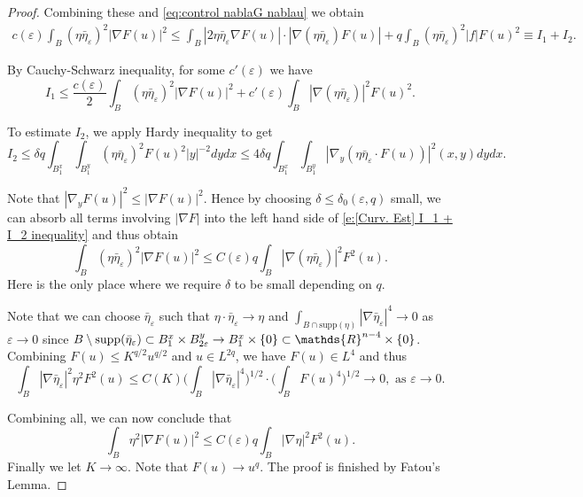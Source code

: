 \documentclass[10pt,a4paper]{amsart}
\newcommand{\RR}{\mathds{R}}
\newcommand{\supp}{\mathrm{supp }}
\begin{document}
\begin{proof}
Combining these and \eqref{eq:control nablaG nablau} we obtain
\begin{align}\label{e:[Curv. Est] I_1 + I_2 inequality}
    c(\varepsilon) \int_B (\eta \bar{\eta}_{\varepsilon})^2 |\nabla F(u)|^2 \leqslant \int_{B} |2 \eta \bar{\eta}_{\varepsilon} \nabla F(u)| \cdot |\nabla(\eta \bar{\eta}_{\varepsilon}) F(u)|  + q \int_B (\eta \bar{\eta}_{\varepsilon})^2 |f| F(u)^2 \equiv I_1 + I_2.
\end{align}

By Cauchy-Schwarz inequality, for some $c'(\varepsilon)$ we have
\begin{equation}
    I_1 \leqslant \frac{c(\varepsilon)}{2} \int_B (\eta \bar{\eta}_{\varepsilon})^2 |\nabla F(u)|^2 + c'(\varepsilon) \int_B |\nabla (\eta \bar{\eta}_{\varepsilon})|^2 F(u)^2.
\end{equation}

To estimate $I_2$, we apply Hardy inequality to get
\begin{equation}\label{e:[curvatuer bound] I_2}
    I_2 \leqslant  \delta q \int_{B_1^x} \int_{B_1^y} 
    (\eta \bar{\eta}_{\varepsilon})^2 F(u)^2 |y|^{-2} dy dx \leqslant  4\delta q \int_{B_1^x} \int_{B_1^y} |\nabla_y   (\eta \bar{\eta}_{\varepsilon} \cdot F(u))|^2(x,y) dy dx. 
\end{equation}

Note that $|\nabla_y F(u)|^2 \leqslant |\nabla F(u)|^2$. Hence by choosing $\delta \leqslant \delta_0(\varepsilon,q)$ small, we can absorb all terms involving $|\nabla F|$ into the left hand side of \eqref{e:[Curv. Est] I_1 + I_2 inequality} and thus obtain
\begin{equation}
    \int_{B} (\eta \bar{\eta}_{\varepsilon})^2 |\nabla F(u)|^2 \leqslant C(\varepsilon)q \int_B |\nabla (\eta \bar{\eta}_{\varepsilon})|^2 F^2(u).
\end{equation}
Here is the only place where we require $\delta$ to be small depending on $q$. 

Note that we can choose $\bar{\eta}_{\varepsilon}$ such that $\eta \cdot \bar{\eta}_{\varepsilon} \to \eta$ and $\int_{B \cap \supp(\eta)} | \nabla \bar{\eta}_{\varepsilon}|^4 \to 0$ as $\varepsilon \to 0$ since $B\setminus \supp(\Bar{\eta}_{\varepsilon}) \subset B_1^x \times B_{2\varepsilon}^y \to B_1^x \times \{0\} \subset \RR^{n-4} \times \{0\}$. Combining $F(u) \leqslant K^{q/2} u^{q/2}$ and $u \in L^{2q}$, we have $F(u) \in L^4$ and thus
\begin{equation}
    \int_{B} |\nabla \bar{\eta}_{\varepsilon}|^2 \eta^2 F^2(u) \leqslant C(K) \Bigg(\int_{B} |\nabla \bar{\eta}_{\varepsilon}|^4 \Bigg)^{1/2} \cdot \Bigg( \int_B F(u)^4 \Bigg)^{1/2} \to 0, \text{ as } \varepsilon \to 0.
\end{equation}

Combining all, we can now conclude that
\begin{equation}
    \int_{B} \eta^2 |\nabla F(u)|^2 \leqslant C(\varepsilon)q \int_B |\nabla \eta|^2 F^2(u).
\end{equation}
Finally we let $K \to \infty$. Note that $F(u) \to u^{q}$. The proof is finished by Fatou's Lemma.    \end{proof}
\end{document}
